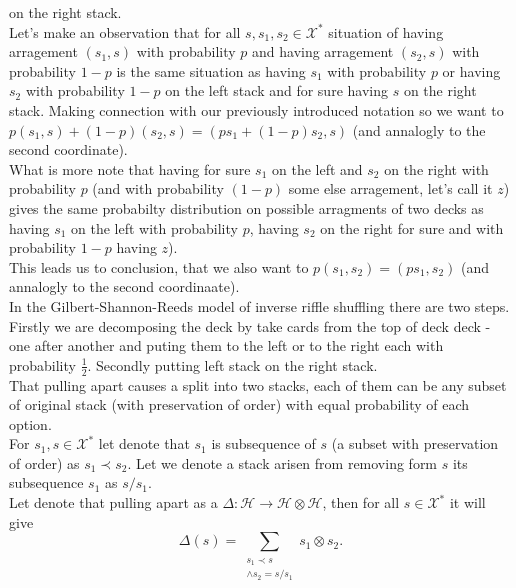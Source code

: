 \documentclass[a4paper, 12pt]{report}
\begin{document}
on the right stack. \\ 
Let's make an observation that for all $s, s_1, s_2 \in \mathcal{X}^*$ situation of having arragement 
$(s_1, s)$ with probability $p$ and having arragement $(s_2, s)$ with probability $1-p$ is 
the same situation as having $s_1$ with probability $p$ or having $s_2$ with probability $1 - p$ on the left 
stack and for sure having $s$ on the right stack. Making connection with our previously introduced notation 
so we want to $p(s_1, s) + (1-p)(s_2, s) = (ps_1 + (1-p)s_2, s)$ (and annalogly to the second coordinate).\\
What is more note that having for sure $s_1$ on the left and $s_2$ on the right with probability $p$ (and 
with probability $(1 - p)$ some else arragement, let's call it $z$) gives the same probabilty distribution 
on possible arragments of two decks as having $s_1$ on the left with probability $p$, having $s_2$ on the 
right for sure and with probability $1-p$ having $z$).\\
This leads us to conclusion, that we also want to $p(s_1,s_2) = (ps_1, s_2)$ (and annalogly to the second 
coordinaate). \\
In the Gilbert-Shannon-Reeds model of inverse riffle shuffling there are two steps. Firstly we are 
decomposing the deck by take cards from the top of deck deck - one after another and puting them to the left 
or to the right each with probability $\frac{1}{2}$. Secondly putting left stack on the right stack. \\
That pulling apart causes a split into two stacks, each of them can be any subset of original stack 
(with preservation of order) with equal probability of each option. \\
For $s_1, s \in \mathcal{X}^*$ let denote that $s_1$ is subsequence of $s$ (a subset with preservation of 
order) as $s_1 \prec s_2$. Let we denote a stack arisen from removing form $s$ its subsequence $s_1$ as 
$s/s_1$. \\
Let denote that pulling apart as a $\Delta : \mathcal{H} \to \mathcal{H} \otimes \mathcal{H}$, then for all 
$s \in \mathcal{X}^*$ it will give
\begin{equation*}
\Delta(s) = \sum_{\substack{s_1 \prec s \\ \land s_2 = s/s_1}}
s_1 \otimes s_2.
\end{equation*}
\end{document}
